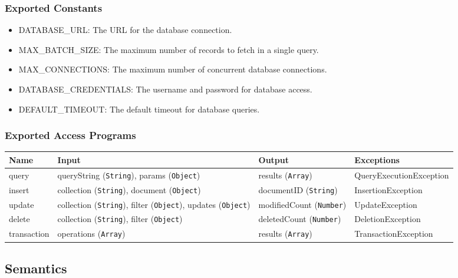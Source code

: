 \documentclass[12pt, titlepage]{article}
\begin{document}
\subsubsection{Exported Constants}
\begin{itemize}
    \item DATABASE\_URL: The URL for the database connection.
    \item MAX\_BATCH\_SIZE: The maximum number of records to fetch in a single query.
    \item MAX\_CONNECTIONS: The maximum number of concurrent database connections.
    \item DATABASE\_CREDENTIALS: The username and password for database access.
    \item DEFAULT\_TIMEOUT: The default timeout for database queries.
\end{itemize}

\subsubsection{Exported Access Programs}
\begin{center}
    \scriptsize
    \begin{tabular}{|p{3cm}|p{4cm}|p{4cm}|p{4cm}|}
        \hline
        \textbf{Name} & \textbf{Input} & \textbf{Output} & \textbf{Exceptions} \\
        \hline
        query & queryString (\texttt{String}), params (\texttt{Object}) & results (\texttt{Array}) & QueryExecutionException \\
        \hline
        insert & collection (\texttt{String}), document (\texttt{Object}) & documentID (\texttt{String}) & InsertionException \\
        \hline
        update & collection (\texttt{String}), filter (\texttt{Object}), updates (\texttt{Object}) & modifiedCount (\texttt{Number}) & UpdateException \\
        \hline
        delete & collection (\texttt{String}), filter (\texttt{Object}) & deletedCount (\texttt{Number}) & DeletionException \\
        \hline
        transaction & operations (\texttt{Array}) & results (\texttt{Array}) & TransactionException \\
        \hline
    \end{tabular}
\end{center}

\subsection{Semantics}
\end{document}
